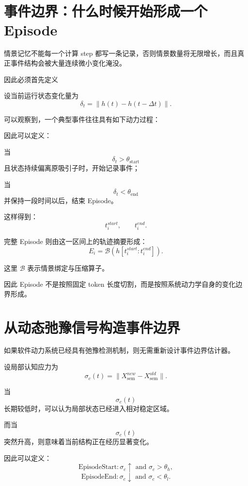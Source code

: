 \section{事件边界：什么时候开始形成一个Episode}

情景记忆不能每一个计算 step 都写一条记录，否则情景数量将无限增长，而且真正事件结构会被大量连续微小变化淹没。

因此必须首先定义
\begin{statementbox}
\centering
{}
\end{statementbox}

设当前运行状态变化量为
\[
\delta_t
=
\|h(t)-h(t-\Delta t)\|.
\]

可以观察到，一个典型事件往往具有如下动力过程：
\begin{statementbox}
\centering
{}
\end{statementbox}

因此可以定义：

当
\[
\delta_t>\theta_{\mathrm{start}}
\]
且状态持续偏离原吸引子时，开始记录事件；

当
\[
\delta_t<\theta_{\mathrm{end}}
\]
并保持一段时间以后，结束 Episode。

这样得到：
\[
t_i^{start},
\qquad
t_i^{end}.
\]

完整 Episode 则由这一区间上的轨迹摘要形成：
\[
E_i
=
\mathcal{B}
\left(
h[t_i^{start}:t_i^{end}]
\right).
\]

这里 $\mathcal{B}$ 表示情景绑定与压缩算子。

因此 Episode 不是按照固定 token 长度切割，而是按照系统动力学自身的变化边界形成。

\section{从动态弛豫信号构造事件边界}

如果软件动力系统已经具有弛豫检测机制，则无需重新设计事件边界估计器。

设局部认知应力为
\[
\sigma_c(t)
=
\|
X_{\mathrm{sem}}^{new}
-
X_{\mathrm{sem}}^{old}
\|.
\]

当
\[
\sigma_c(t)
\]
长期较低时，可以认为局部状态已经进入相对稳定区域。

而当
\[
\sigma_c(t)
\]
突然升高，则意味着当前结构正在经历显著变化。

因此可以定义：
\[
\mathrm{EpisodeStart}
:
\sigma_c
\uparrow
\text{ and }
\sigma_c>\theta_h,
\]
\[
\mathrm{EpisodeEnd}
:
\sigma_c
\downarrow
\text{ and }
\sigma_c<\theta_l.
\]

